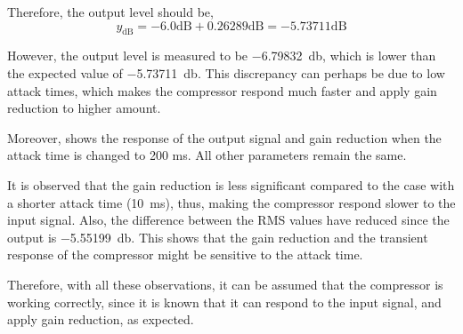Therefore, the output level should be,
$$
y_\text{dB} = -6.0 \text{dB} + 0.26289 \text{dB} = -5.73711 \text{dB}
$$

However, the output level is measured to be \SI{-6.79832}{\decibel}, which is lower than the expected value of \SI{-5.73711}{\decibel}.
This discrepancy can perhaps be due to low attack times, which makes the compressor respond much faster and apply gain reduction to
higher amount.

Moreover,  shows the response of the output signal and gain reduction 
when the attack time is changed to 200 ms. All other parameters remain the same.



It is observed that the gain reduction is less significant compared to the case with a shorter attack time 
(\SI{10}{\milli\second}), thus, making the compressor respond slower to the input signal. Also, the difference between 
the RMS values have reduced since the output is \SI{-5.55199}{\decibel}. This shows that the gain reduction and 
the transient response of the compressor might be sensitive to the attack time.

Therefore, with all these observations, it can be assumed that the compressor is working correctly, since it is 
known that it can respond to the input signal, and apply gain reduction, as expected.


